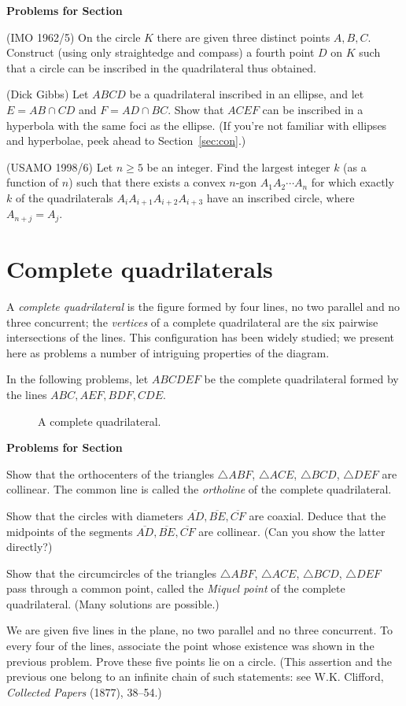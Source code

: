 \documentclass[12pt]{book}
\newcounter{exc}
\numberwithin{exc}{section}
\numberwithin{figure}{section}
\newenvironment{exer}{\vspace{0.1in}
\noindent \textbf{Problems for Section~\thesection} \vspace{0.1in}
\begin{list}{\arabic{exc}.}{\usecounter{exc}}}{\end{list}}
\numberwithin{equation}{theorem}
\def\ii{\item}
\def\seg#1{\overline{#1}}
\begin{document}
\begin{exer}
\ii (IMO 1962/5)
On the circle $K$ there are given three distinct points $A,B,C$. 
Construct (using only straightedge and compass) a fourth point $D$ 
on $K$ such that a circle can be inscribed in the quadrilateral thus 
obtained.
\ii (Dick Gibbs)
Let $ABCD$ be a quadrilateral inscribed in an ellipse, and let $E = AB 
\cap CD$ and $F = AD \cap BC$. Show that $ACEF$ can be inscribed in a 
hyperbola with the same foci as the ellipse. (If you're not familiar 
with ellipses and hyperbolae, peek ahead to Section~\ref{sec:con}.)
\ii (USAMO 1998/6) \label{ex:circquads}
Let $n \geq 5$ be an integer. Find the largest integer $k$ (as a 
function of $n$) such that there exists a convex $n$-gon $A_1A_2\cdots 
A_n$ for which exactly $k$ of the quadrilaterals 
$A_iA_{i+1}A_{i+2}A_{i+3}$ have an inscribed circle, where 
$A_{n+j} = A_j$.
\end{exer}

\section{Complete quadrilaterals}

A  
\emph{complete quadrilateral} is the figure formed by four lines, no
two parallel and no three concurrent; the \emph{vertices} of a
complete quadrilateral are the six pairwise intersections of the
lines. This configuration has been widely studied; we present here as
problems a number of intriguing properties of the diagram.

In the following problems, let $ABCDEF$ be the complete quadrilateral 
formed by the lines $ABC, AEF, BDF, CDE$. 
\begin{figure}[ht]
\caption{A complete quadrilateral.}
\end{figure}

\begin{exer}
\ii
Show that the orthocenters of the triangles $\triangle ABF$,
$\triangle ACE$, $\triangle BCD$, $\triangle DEF$ are collinear.
The common line is called the \emph{ortholine} 
of the complete quadrilateral.
\ii \label{ex:comp quad coaxial}
Show that the circles with diameters $\seg{AD}, \seg{BE}, \seg{CF}$ 
are coaxial. Deduce 
that the midpoints of the segments $\seg{AD}, \seg{BE}, \seg{CF}$ are 
collinear. (Can you show the latter directly?)
\ii %
Show that the circumcircles of the triangles 
$\triangle ABF$,
$\triangle ACE$, $\triangle BCD$, $\triangle DEF$ 
pass through a 
common point, called the \emph{Miquel point} 
 of the complete
quadrilateral. (Many solutions are possible.)
\ii
We are given five lines in the plane, no two parallel and no three 
concurrent. To every four of the lines, associate the point whose 
existence was shown in the previous problem. Prove these five points 
lie on a circle. (This assertion and the previous one belong to an 
infinite chain of such statements: see W.K. Clifford, 
\textit{Collected Papers} (1877), 38--54.)
\end{exer}
\end{document}
